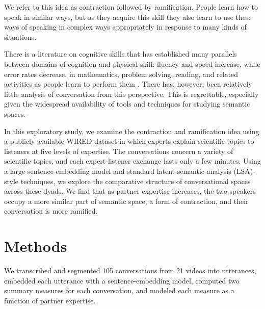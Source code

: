 \documentclass{article}
\begin{document}
We refer to this idea as contraction followed by ramification. People learn how to speak in similar ways, but as they acquire this skill they also learn to use these ways of speaking in complex ways appropriately in response to many kinds of situations.

There is a literature on cognitive skills that has established many parallels between domains of cognition and physical skill: fluency and speed increase, while error rates decrease, in mathematics, problem solving, reading, and related activities as people learn to perform them \citep{groot_thought_1965,robinson_mathematical_1978,egan_chunking_1979,chi1981expertise}. There has, however, been relatively little analysis of conversation from this perspective. This is regrettable, especially given the widespread availability of tools and techniques for studying semantic spaces.

In this exploratory study, we examine the contraction and ramification idea using a publicly available WIRED dataset in which experts explain scientific topics to listeners at five levels of expertise. The conversations concern a variety of scientific topics, and each expert-listener exchange lasts only a few minutes. Using a large sentence-embedding model and standard latent-semantic-analysis (LSA)-style techniques, we explore the comparative structure of conversational spaces across these dyads. We find that as partner expertise increases, the two speakers occupy a more similar part of semantic space, a form of contraction, and their conversation is more ramified. 


\section{Methods}

We transcribed and segmented 105 conversations from 21 videos into utterances, embedded each utterance with a sentence-embedding model, computed two summary measures for each conversation, and modeled each measure as a function of partner expertise.
\end{document}
